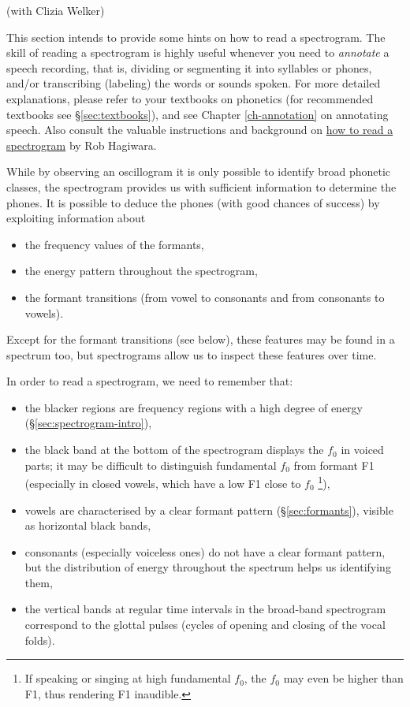 \documentclass[
]{book}
\begin{document}
(with Clizia Welker)

\label{box-spectrogram}
This section intends to provide some hints on how to read a spectrogram. The skill of reading a spectrogram is highly useful whenever you need to \emph{annotate} a speech recording, that is, dividing or segmenting it into syllables or phones, and/or transcribing (labeling) the words or sounds spoken. For more detailed explanations, please refer to your textbooks on phonetics (for recommended textbooks see §\ref{sec:textbooks}), and see Chapter \ref{ch-annotation} on annotating speech. Also consult the valuable instructions and background on \href{https://home.cc.umanitoba.ca/~robh/howto.html}{how to read a spectrogram} by Rob Hagiwara.

While by observing an oscillogram it is only possible to identify broad phonetic classes, the spectrogram provides us with sufficient information to determine the phones. It is possible to deduce the phones (with good chances of success) by exploiting information about

\begin{itemize}
\item
  the frequency values of the formants,
\item
  the energy pattern throughout the spectrogram,
\item
  the formant transitions (from vowel to consonants and from consonants to vowels).
\end{itemize}

Except for the formant transitions (see below), these features may be found in a spectrum too, but spectrograms allow us to inspect these features over time.

In order to read a spectrogram, we need to remember that:

\begin{itemize}
\item
  the blacker regions are frequency regions with a high degree of energy (§\ref{sec:spectrogram-intro}),
\item
  the black band at the bottom of the spectrogram displays the \(f_0\) in voiced parts; it may be difficult to distinguish fundamental \(f_0\) from formant F1 (especially in closed vowels, which have a low F1 close to \(f_0\) \footnote{If speaking or singing at high fundamental \(f_0\), the \(f_0\) may even be higher than F1, thus rendering F1 inaudible.}),
\item
  vowels are characterised by a clear formant pattern (§\ref{sec:formants}), visible as horizontal black bands,
\item
  consonants (especially voiceless ones) do not have a clear formant pattern, but the distribution of energy throughout the spectrum helps us identifying them,
\item
  the vertical bands at regular time intervals in the broad-band spectrogram correspond to the glottal pulses (cycles of opening and closing of the vocal folds).
\end{itemize}
\end{document}
